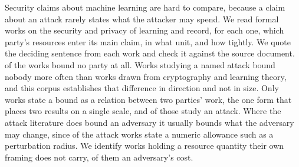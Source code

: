 Security claims about machine learning are hard to compare, because a claim
about an attack rarely states what the attacker may spend. We read
\NumSources{} formal works on the security and privacy of learning and record,
for each one, which party's resources enter its main claim, in what unit, and
how tightly. We quote the deciding sentence from each work and check it
against the source document. \NumUnstated{} of the works bound no party at
all. Works studying a named attack bound nobody more often than works drawn
from cryptography and learning theory, and this corpus establishes that
difference in direction and not in size. Only \NumRelative{} works state a
bound as a relation between two parties' work, the one form that places two
results on a single scale, and \NumRelativeAttack{} of those study an attack.
Where the attack literature does bound an adversary it usually bounds what the
adversary may change, since \AttackBudget{} of the \NumAttackWorks{} attack
works state a numeric allowance such as a perturbation radius. We identify
\NearMiss{} works holding a resource quantity their own framing does not carry,
\NearMissAdv{} of them an adversary's cost.
